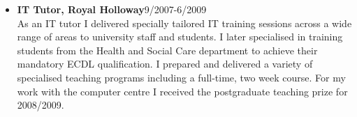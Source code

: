 \documentclass[10pt]{article}
\newenvironment{outerlist}[1][\enskip\textbullet]%
        {\begin{itemize}[#1]}{\end{itemize}%
         \vspace{-.6\baselineskip}}
\begin{document}
\begin{outerlist}

%


\item[] {\bf IT Tutor, Royal Holloway}\hfill 9/2007-6/2009\\
As an IT tutor I delivered  specially tailored IT training sessions across a wide range of areas to university staff and students. I later specialised in training students from the Health and Social Care department to achieve their mandatory ECDL qualification.  I prepared and delivered a variety of specialised teaching programs including a full-time, two week course.  For my work with the computer centre I received the postgraduate teaching prize for 2008/2009.

\end{outerlist}
\end{document}
